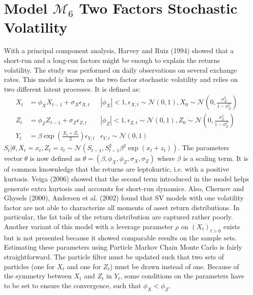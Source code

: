 \documentclass[11pt,a4,twosided,singlespacing,titlepagenumber=on]{scrreprt}
\numberwithin{equation}{chapter} %
\theoremstyle{remark}
\begin{document}
\section{Model $\mathcal{M}_6$ Two Factors Stochastic Volatility}
With a principal component analysis, Harvey and Ruiz (1994) showed that a short-run and a long-run factors might be enough to explain the returns volatility. The study was performed on daily observations on several exchange rates. This model is known as the two factor stochastic volatility and relies on two different latent processes. It is defined as:
\begin{align*}
  X_t 						&=  \phi_X X_{t-1} + \sigma_X \epsilon_{X,t} &|\phi_X| < 1, \epsilon_{X,t} \sim \mathcal{N}(0,1), X_0 \sim \mathcal{N} \left(0, \frac{\sigma_X^2}{1 - \phi_X^2} \right)\\
  Z_t 						&=  \phi_Z Z_{t-1} + \sigma_Z \epsilon_{Z,t} &|\phi_Z| < 1, \epsilon_{Z,t} \sim \mathcal{N}(0,1), Z_0 \sim \mathcal{N} \left(0, \frac{\sigma_Z^2}{1 - \phi_Z^2} \right)\\
  Y_t 						&=  \beta \exp \left( \frac{X_t+Z_t}{2} \right) \epsilon_{Y,t} &\epsilon_{Y,t} \sim \mathcal{N}(0,1)
\end{align*}
$S_t | \theta, X_t = x_t, Z_t = z_t \sim \mathcal{N}\left(S_{t-1}, S_{t-1}^2 \beta^2 \exp \left(x_t + z_t\right) \right)$. The parameters vector $\theta$ is now defined as $\theta = (\beta, \phi_X, \phi_Z, \sigma_X, \sigma_Z)$ where $\beta$ is a scaling term. It is of common knownledge that the returns are leptokurtic, i.e. with a positive kurtosis. Veiga (2006) showed that the second term introduced in the model helps generate extra kurtosis and accounts for short-run dynamics. Also, Chernov and Ghysels (2000), Andersen et al. (2002) found that SV models with one volatility factor are not able to characterize all moments of asset return distributions. In particular, the fat tails of the return distribution are captured rather poorly. Another variant of this model with a leverage parameter $\rho$ on $(X_t)_{t>0}$ exists but is not presented because it showed comparable results on the sample sets.\\
\noindent
Estimating these parameters using Particle Markov Chain Monte Carlo is fairly straightforward. The particle filter must be updated such that two sets of particles (one for $X_t$ and one for $Z_t$) must be drawn instead of one. Because of the symmetry between $X_t$ and $Z_t$ in $Y_t$, some conditions on the parameters have to be set to ensure the convergence, such that $\phi_X < \phi_Z$.
\end{document}
